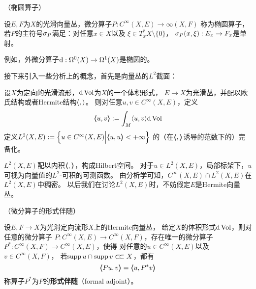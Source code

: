 \begin{definition}（椭圆算子）

设$E,F$为$X$的光滑向量丛，微分算子$P:C^\infty(X,E)\to\infty(X,F)$
称为椭圆算子，若$P$的主符号$\sigma_P$满足：对任意$x\in X$以及
$\xi\in T^*_xX\setminus\{0\}$，
$\sigma_P(x,\xi):E_x\to F_x$是单射。
\end{definition}

例如，外微分算子$\mathrm{d}:\Omega^0(X)\to\Omega^1(X)$是椭圆的。


接下来引入一些分析上的概念，首先是向量丛的$L^2$截面：

\begin{definition}
设$X$为定向的光滑流形，$\mathrm{d}\operatorname{Vol}$为$X$的一个体积形式，
$E\to X$为光滑丛，并配以欧氏结构或者Hermite结构$\langle , \rangle$。
则对任意$u,v\in C^\infty(X,E)$，定义
$$
  \langle\!\! \langle u,v \rangle\!\! \rangle
:=
  \int_M\langle u,v \rangle\mathrm{d}\operatorname{Vol}
$$
定义$L^2(X,E):=\Big\{ u\in C^\infty(X,E) \Big| \langle\!\! \langle u,u \rangle\!\! \rangle<+\infty \Big\}$
的（在$\langle\!\! \langle , \rangle\!\! \rangle$诱导的范数下的）完备化。
\end{definition}


$L^2(X,E)$配以内积$\langle\!\! \langle , \rangle\!\! \rangle$，构成Hilbert空间。
对于$u\in L^2(X,E)$，局部标架下，$u$可视为向量值的$L^2$-可积的可测函数。
由分析学可知，$C^\infty(X,E)\cap L^2(X,E)$在$L^2(X,E)$中稠密。
以后我们在讨论$L^2(X,E)$时，不妨假定$E$是Hermite向量丛。

\begin{prop}（微分算子的形式伴随）

设$E,F\to X$为光滑定向流形$X$上的Hermite向量丛，
给定$X$的体积形式$\mathrm{d}\operatorname{Vol}$，则对任意的微分算子
$P:C^\infty(X,E)\to C^\infty(X,F)$，存在唯一的微分算子
$P^*:C^\infty(X,F)\to C^\infty(X,E)$，使得
对任意的$u\in C^\infty(X,E)$以及$v\in C^\infty(X,F)$，
若$\operatorname{supp} u\cap\operatorname{supp} v\subset\!\subset X$，都有
$$
  \ppair{Pu}{v}
= \ppair{u}{P^*v}
$$
称算子$P^*$为$P$的\textbf{形式伴随}（formal adjoint）。
\end{prop}

